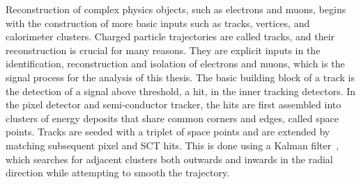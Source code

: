 Reconstruction of complex physics objects, such as electrons and muons, begins with the construction of more basic inputs such as tracks, vertices, and calorimeter clusters. 
Charged particle trajectories are called tracks, and their reconstruction is crucial for many reasons. They are explicit inputs in the identification, reconstruction and isolation of electrons and muons, which is the signal process for the analysis of this thesis. The basic building block of a track is the detection of a signal above threshold, a hit, in the inner tracking detectors. In the pixel detector and semi-conductor tracker, the hits are first assembled into clusters of energy deposits that share common corners and edges, called space points. Tracks are seeded with a triplet of space points and are extended by matching subsequent pixel and SCT hits. This is done using a Kalman filter~\cite{ATLAS-CONF-2012-042}, which searches for adjacent clusters both outwards and inwards in the radial direction while attempting to smooth the trajectory.

